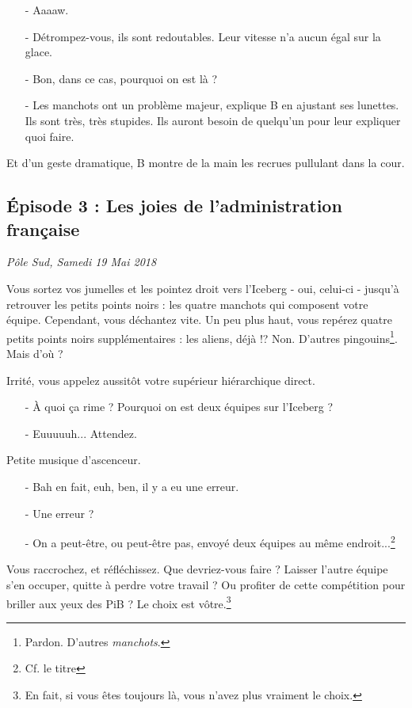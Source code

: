 \begin{itemize}
    \item[-] Aaaaw.
    \item[-] Détrompez-vous, ils sont redoutables. Leur vitesse n'a aucun égal
        sur la glace.
    \item[-] Bon, dans ce cas, pourquoi on est là ?
    \item[-] Les manchots ont un problème majeur, explique B en ajustant ses
        lunettes. Ils sont très, très stupides. Ils auront besoin de quelqu'un
        pour leur expliquer quoi faire.
\end{itemize}

Et d'un geste dramatique, B montre de la main les recrues pullulant dans la
cour.

\newpage
\subsection{Épisode 3 : Les joies de l'administration française}
\hfill \textit{Pôle Sud, Samedi 19 Mai 2018}

Vous sortez vos jumelles et les pointez droit vers l'Iceberg - oui, celui-ci -
jusqu'à retrouver les petits points noirs : les quatre manchots qui composent
votre équipe.
Cependant, vous déchantez vite. Un peu plus haut, vous repérez quatre petits
points noirs supplémentaires : les aliens, déjà !? Non. D'autres
pingouins\footnote{Pardon. D'autres \emph{manchots}.}. Mais d'où ?

Irrité, vous appelez aussitôt votre supérieur hiérarchique direct.

\begin{itemize}
    \item[-] À quoi ça rime ? Pourquoi on est deux équipes sur l'Iceberg ?
    \item[-] Euuuuuh... Attendez.
\end{itemize}

Petite musique d'ascenceur.

\begin{itemize}
    \item[-] Bah en fait, euh, ben, il y a eu une erreur.
    \item[-] Une erreur ?
    \item[-] On a peut-être, ou peut-être pas, envoyé deux équipes au même
        endroit...\footnote{Cf. le titre}
\end{itemize}

Vous raccrochez, et réfléchissez. Que devriez-vous faire ? Laisser l'autre
équipe s'en occuper, quitte à perdre votre travail ? Ou profiter de cette
compétition pour briller aux yeux des PiB ? Le choix est vôtre.\footnote{En
fait, si vous êtes toujours là, vous n'avez plus vraiment le choix.}
